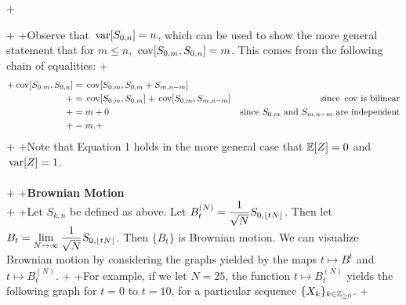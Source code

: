 +\documentclass{article}
\begin{document}
+
+Observe that $\,\mathrm{var}[S_{0,n}]=n$, which can be used to show the more general statement that for $m\leq n$, $\,\mathrm{cov}[S_{0,m},S_{0,n}]=m$.  This comes from the following chain of equalities:
+\begin{align*}
+\,\mathrm{cov}[S_{0.m},S_{0,n}]&=\,\mathrm{cov}[S_{0,m},S_{0,m}+S_{m,n-m}]\\
+&=\,\mathrm{cov}[S_{0,m},S_{0,m}]+\,\mathrm{cov}[S_{0,m},S_{m,n-m}]&\text{since }\,\mathrm{cov}\text{ is bilinear}\\
+&=m+0&\text{since }S_{0,m}\text{ and }S_{m,n-m}\text{ are independent}\\
+&=m.
+\end{align*}
+
+Note that Equation 1 holds in the more general case that $\mathbb{E}[Z]=0$ and $\,\mathrm{var}[Z]=1$.\\\\
+
+\textbf{\Large Brownian Motion}\\
+
+Let $S_{k,n}$ be defined as above.  Let $\displaystyle B_t^{(N)}=\frac{1}{\sqrt{N}}S_{0,\lfloor tN\rfloor}$.  Then let $\displaystyle B_t=\lim_{N\to\infty}\frac{1}{\sqrt{N}}S_{0,\lfloor tN\rfloor}$.  Then $\{B_t\}$ is Brownian motion.  We can visualize Brownian motion by considering the graphs yielded by the maps $t\mapsto B^t$ and $t\mapsto B_t^{(N)}$.
+
+For example, if we let $N=25$, the function $t\mapsto B_t^{(N)}$ yields the following graph for $t=0$ to $t=10$, for a particular sequence $\{X_k\}_{k\in\mathbb{Z}_{\geq 0}}$.
+
\end{document}
